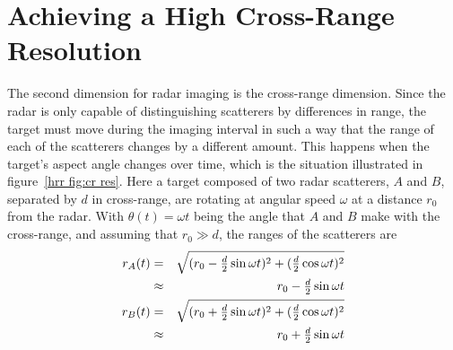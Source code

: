 \section{Achieving a High Cross-Range Resolution}


The second dimension for radar imaging is the cross-range dimension.  Since 
the radar is only capable of distinguishing scatterers by differences in
range, the target must move during the imaging interval in such a way that
the range of each of the scatterers changes by a different amount.  This
happens when the target's aspect angle changes over time, which is the
situation illustrated in figure~\ref{hrr fig:cr res}.  Here a target
composed of two radar scatterers, $A$ and $B$, separated by $d$ in
cross-range, are rotating at angular speed $\omega$ at a distance $r_0$ from
the radar.  With $\theta(t)=\omega t$ being the angle that $A$ and $B$ make
with the cross-range, and assuming that $r_0\gg d$, the ranges of the
scatterers are
\begin{eqnarray}
r_A(t)
&=&\sqrt{(r_0-{\textstyle\frac{d}{2}}\sin\omega t)^2
	+({\textstyle\frac{d}{2}}\cos\omega t)^2}		{\nonumber}\\
&\approx&r_0-{\textstyle\frac{d}{2}}\sin\omega t		\\
r_B(t)
&=&\sqrt{(r_0+{\textstyle\frac{d}{2}}\sin\omega t)^2
	+({\textstyle\frac{d}{2}}\cos\omega t)^2}		{\nonumber}\\
&\approx&r_0+{\textstyle\frac{d}{2}}\sin\omega t		
\end{eqnarray}

